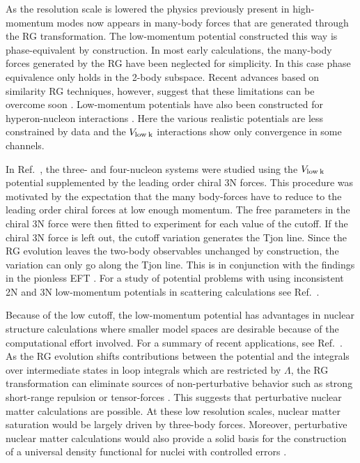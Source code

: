 \documentclass[aps,rmp,nofootinbib,twocolumn,floatfix]{revtex4}
\begin{document}
As the resolution scale is lowered the
physics previously present in high-momentum modes now appears 
in many-body forces that are generated through the RG transformation.
The low-momentum potential constructed this way is phase-equivalent 
by construction. In most early calculations, the many-body forces 
generated by the RG have been neglected for simplicity. In this case
phase equivalence only holds in the 2-body subspace. Recent 
advances based on similarity RG techniques, however,
suggest that these limitations can be overcome soon 
\cite{Bogner:2006pc,Jurgenson:2008jp}.
Low-momentum potentials have also
been constructed for hyperon-nucleon interactions
\cite{Schaefer:2005fi,Dapo:2008qv}. Here the various 
realistic potentials are less constrained by data and the $V_{\rm low\: k}$
interactions show only convergence in some channels.


In Ref.~\cite{Nogga:2004ab}, the three- and four-nucleon systems
were studied using the $V_{\rm low\: k}$
potential supplemented by the leading order chiral 3N forces.
This procedure was motivated by the expectation that the many body-forces
have to reduce to the leading order chiral forces at low enough momentum.
The free parameters in the chiral 3N force were then fitted to 
experiment for each value of the cutoff. If the  chiral 3N force
is left out, the cutoff variation generates the Tjon line. Since the
RG evolution leaves the two-body observables unchanged by construction,
the variation can only go along the Tjon line.
This is in conjunction with the findings in the pionless EFT
\cite{Platter:2004zs}. For a study of potential problems with using
inconsistent 2N and 3N low-momentum potentials in scattering calculations
see Ref.~\cite{Fujii:2004dd}. 

Because of the low cutoff,
the low-momentum potential has advantages in nuclear structure
calculations where smaller model spaces are desirable because
of the computational effort involved. For a summary
of recent applications, see Ref.~\cite{Schwenk:2008su}.
As the RG evolution shifts contributions between the potential
and the integrals over intermediate states in loop integrals
which are restricted by $\Lambda$, the RG transformation can eliminate
sources of non-perturbative behavior such as strong short-range 
repulsion or tensor-forces \cite{Bogner:2005sn,Bogner:2006tw}.
This suggests that perturbative nuclear matter calculations 
are possible. At these low resolution scales, nuclear matter
saturation would be largely driven by three-body forces. Moreover,
perturbative nuclear matter calculations would also 
provide a solid basis for the construction of a universal 
density functional for nuclei with controlled errors 
\cite{Furnstahl:2007xm,Scidac:2007aa}.
\end{document}
